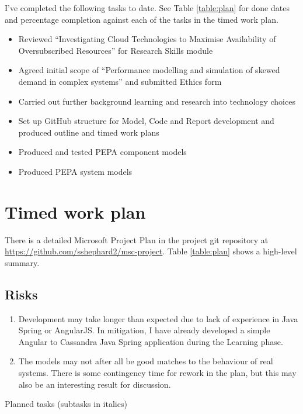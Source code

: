 \documentclass{llncs}
\begin{document}
I've completed the following tasks to date. See Table \ref{table:plan} for done dates and percentage completion against each of the tasks in the timed work plan.
\begin{itemize}
	\item Reviewed ``Investigating Cloud Technologies to Maximise Availability of Oversubscribed Resources'' for Research Skills module
	\item Agreed initial scope of ``Performance modelling and simulation of skewed demand in complex systems'' and submitted Ethics form
	\item Carried out further background learning and research into technology choices
	\item Set up GitHub structure for Model, Code and Report development and produced outline and timed work plans
	\item Produced and tested PEPA component models
	\item Produced PEPA system models
\end{itemize}

%
%

\section{Timed work plan}

There is a detailed Microsoft Project Plan in the project git repository at \url{https://github.com/sshephard2/msc-project}.  Table \ref{table:plan} shows a high-level summary.

\subsection{Risks}
\begin{enumerate}
	\item Development may take longer than expected due to lack of experience in Java Spring or AngularJS.  In mitigation, I have already developed a simple Angular to Cassandra Java Spring application during the Learning phase.
	\item The models may not after all be good matches to the behaviour of real systems.  There is some contingency time for rework in the plan, but this may also be an interesting result for discussion.
\end{enumerate}

\begin{table}[h!]
	\begin{center}
		\caption{Planned tasks (subtasks in italics)}
		\label{table:plan}
	\end{center}
\end{table}


%
%

\newpage



\end{document}
